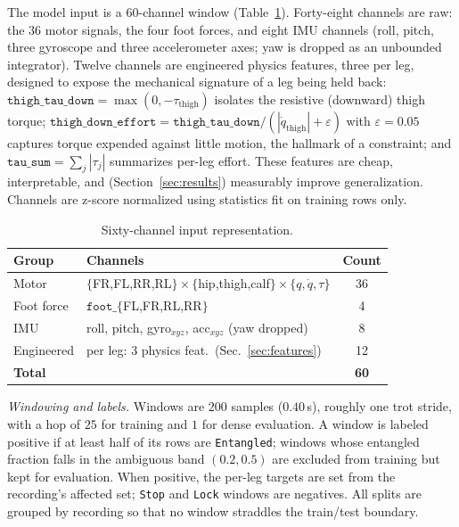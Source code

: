 \documentclass[conference]{IEEEtran}
\begin{document}
The model input is a $60$-channel window (Table~\ref{tab:features}). Forty-eight
channels are raw: the $36$ motor signals, the four foot forces, and eight IMU
channels (roll, pitch, three gyroscope and three accelerometer axes; yaw is dropped
as an unbounded integrator). Twelve channels are engineered physics features, three
per leg, designed to expose the mechanical signature of a leg being held back:
$\texttt{thigh\_tau\_down}=\max(0,-\tau_{\text{thigh}})$ isolates the
resistive (downward) thigh torque; $\texttt{thigh\_down\_effort}=
\texttt{thigh\_tau\_down}/(|\dot q_{\text{thigh}}|+\varepsilon)$ with
$\varepsilon=0.05$ captures torque expended against little motion, the hallmark of a
constraint; and $\texttt{tau\_sum}=\sum_j|\tau_j|$ summarizes per-leg effort. These
features are cheap, interpretable, and (Section~\ref{sec:results}) measurably improve
generalization. Channels are z-score normalized using statistics fit on training rows
only.

\begin{table}[t]
\centering
\caption{Sixty-channel input representation.}
\label{tab:features}
\footnotesize
\begin{tabular}{@{}llc@{}}
\toprule
Group & Channels & Count \\
\midrule
Motor & $\{$FR,FL,RR,RL$\}\!\times\!\{$hip,thigh,calf$\}\!\times\!\{q,\dot q,\tau\}$ & 36 \\
Foot force & $\texttt{foot\_}\{$FL,FR,RL,RR$\}$ & 4 \\
IMU & roll, pitch, gyro$_{xyz}$, acc$_{xyz}$ (yaw dropped) & 8 \\
Engineered & per leg: 3 physics feat.\ (Sec.~\ref{sec:features}) & 12 \\
\midrule
\textbf{Total} & & \textbf{60} \\
\bottomrule
\end{tabular}
\end{table}

\emph{Windowing and labels.} Windows are $200$ samples ($0.40$\,s), roughly one trot
stride, with a hop of $25$ for training and $1$ for dense evaluation. A window is
labeled positive if at least half of its rows are \texttt{Entangled}; windows whose
entangled fraction falls in the ambiguous band $(0.2,0.5)$ are excluded from training
but kept for evaluation. When positive, the per-leg targets are set from the
recording's affected set; \texttt{Stop} and \texttt{Lock} windows are negatives. All
splits are grouped by recording so that no window straddles the train/test boundary.
\end{document}
